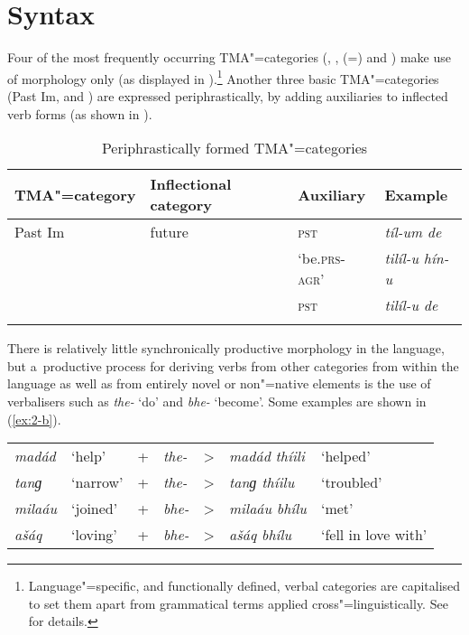 \section{Syntax}
\label{sec:2-3}
Four of the most frequently occurring TMA"=categories (, ,  (=) and ) make use of  morphology only (as displayed in ).\footnote{Language"=specific, and functionally defined, verbal categories are capitalised to set them apart from grammatical terms applied cross"=linguistically. See  for details.} Another three basic TMA"=categories (Past Im,  and ) are expressed periphrastically, by adding auxiliaries to inflected verb forms (as shown in ).


\begin{table}[ht]
\caption{Periphrastically formed TMA"=categories}
\begin{tabularx}{\textwidth}{ l l Q Q }
\lsptoprule
TMA"=category &
Inflectional category &
Auxiliary &
Example \\\midrule
Past Im &
future &
\textsc{pst} &
\textit{tíl-um de} \\
 &
 &
`be.\textsc{prs-agr}' &
\textit{tilíl-u hín-u} \\
 &
 &
\textsc{pst} &
\textit{tilíl-u de} \\\lspbottomrule
\end{tabularx}
\label{tab:2-peri}
\end{table}


There is relatively little synchronically productive  morphology in the language, but a~productive process for deriving verbs from other categories from within the language as well as from entirely novel or non"=native elements is the use of verbalisers such as \textit{the-} `do' and \textit{bhe-} `become'. Some examples are shown in (\ref{ex:2-b}).


\begin{exe}
\extab
\label{ex:2-b}
\begin{tabularx}{116mm}{ l l l l l l l}
\textit{madád} &
`help' &
+ &
\textit{the-} &
{\textgreater} &
\textit{madád thíili} &
`helped'\\
\textit{tanɡ} &
`narrow' &
+ &
\textit{the-} &
{\textgreater} &
\textit{tanɡ thíilu} &
`troubled'\\
\textit{milaáu} &
`joined' &
+ &
\textit{bhe-} &
{\textgreater} &
\textit{milaáu bhílu} &
`met'\\
\textit{ašáq} &
`loving' &
+ &
\textit{bhe-} &
{\textgreater} &
\textit{ašáq bhílu} &
`fell in love with'\\
\end{tabularx}
\end{exe}



